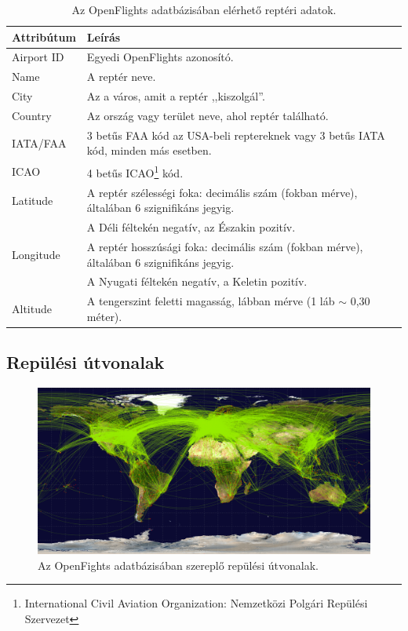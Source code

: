     \begin{table}[ht]
      \footnotesize
      \centering
      \begin{tabular}{ | l | l |}
      \hline
      Attribútum & Leírás \\ \hline
      Airport ID & Egyedi OpenFlights azonosító.\\
      Name & A reptér neve.\\
      City & Az a város, amit a reptér ,,kiszolgál''.\\
      Country & Az ország vagy terület neve, ahol reptér található.\\
      IATA/FAA & 3 betűs FAA kód az USA-beli reptereknek vagy 3 betűs IATA kód, minden más esetben.\\
      ICAO & 4 betűs ICAO\footnote{International Civil Aviation Organization: Nemzetközi Polgári Repülési Szervezet} kód.\\
      Latitude & A reptér szélességi foka: decimális szám (fokban mérve), általában 6 szignifikáns jegyig.\\
      & A Déli féltekén negatív, az Északin pozitív.\\
      Longitude & A reptér hosszúsági foka: decimális szám (fokban mérve), általában 6 szignifikáns jegyig.\\
      & A Nyugati féltekén negatív, a Keletin pozitív.\\
      Altitude & A tengerszint feletti magasság, lábban mérve (1 láb $\sim$ 0,30 méter).\\
      \hline
      \end{tabular}
      \caption{Az OpenFlights adatbázisában elérhető reptéri adatok.}
      \label{tab:table_repterek}
    \end{table}

    \subsection{Repülési útvonalak}
    \begin{figure}[!ht]
      \centering
      \includegraphics[width=150mm,keepaspectratio=true]{./figures/routes-2048.png}

      \caption{Az OpenFights adatbázisában szereplő repülési útvonalak.}
      \label{fig:figure_repulesiutvonalak}
    \end{figure}

